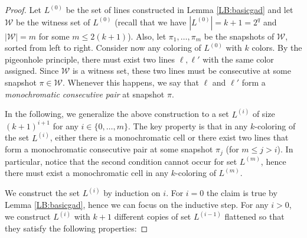 \documentclass[11pt,a4paper]{article}
\begin{document}
\begin{proof}
Let $L^{(0)}$ be the set of lines constructed in Lemma \ref{LB:basicgad} and let $\mathcal{W}$ be the witness set of $L^{(0)}$ (recall that we have $|L^{(0)}|=k+1=2^q$ and $|\mathcal{W}|=m$ for some $m\leq 2(k+1)$). Also, let $\pi_1,\ldots,\pi_m$ be the snapshots of $\mathcal{W}$, sorted from left to right. Consider now any coloring of $L^{(0)}$ with $k$ colors. By the pigeonhole principle, there must exist two lines $\ell,\ell'$ with the same color assigned. Since $\mathcal{W}$ is a witness set, these two lines must be consecutive at some snapshot $\pi \in \mathcal{W}$. Whenever this happens, we say that $\ell$ and $\ell'$ form a {\em monochromatic consecutive pair} at snapshot $\pi$.

In the following, we generalize the above construction to a set $L^{(i)}$ of size $(k+1)^{i+1}$ for any $i \in \{0,\ldots, m\}$. The key property is that in any $k$-coloring of the set $L^{(i)}$, either there is a monochromatic cell or there exist two lines that form a monochromatic consecutive pair at some snapshot $\pi_j$ (for $m\leq j>i$). In particular, notice that the second condition cannot occur for set $L^{(m)}$, hence  there must exist a monochromatic cell in any $k$-coloring of $L^{(m)}$.

We construct the set $L^{(i)}$ by induction on $i$. For $i=0$ the claim is true by Lemma \ref{LB:basicgad}, hence we can focus on the inductive step. For any $i>0$, we construct $L^{(i)}$ with $k+1$ different copies of set $L^{(i-1)}$ flattened so that they satisfy the following properties:

\iffalse
\begin{figure}
   \begin{center}
     \texttt{[image: fig\_induc]}
     \caption{Construction of the set $L^{(i)}$ by combining $k+1$ different copies of $L^{(i-1)}$. In the Figure, each thick line represents a copy of $L^{(i-1)}$ (and the dotted vertical lines the snapshots of $\pi_j$, for $j\geq i$). Observe that all the crossings between lines of different copies occur in the vertical strip $\{0<x<i\}$ (depicted as light gray in the figure). Since no crossing between lines of the same copy occur in the strip, the vertical ordering of the lines of a single copy at any position in the strip is exactly $\pi_i$.
     In the right we depict a larger image of the crossing between two copies of $L^{(i-1)}$. The main property is that any two consecutive lines of a copy of $L^{(i-1)}$ form a quadrilateral with any other pair of consecutive lines of another copy of $L^{(i-1)}$.}
     \label{fig_induc}
   \end{center}
\end{figure}
\fi


\end{proof}
\end{document}
